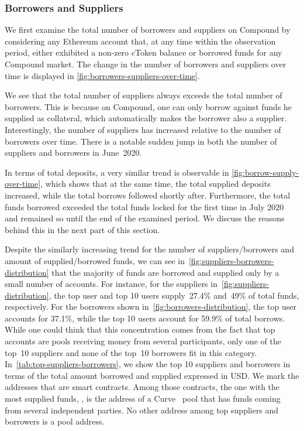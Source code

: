 \subsubsection{Borrowers and Suppliers}
We first examine the total number of borrowers and suppliers on Compound by considering any Ethereum account that, at any time within the observation period, either exhibited a non-zero cToken balance or borrowed funds for any Compound market.
The change in the number of borrowers and suppliers over time is displayed in \autoref{fig:borrowers-suppliers-over-time}.

We see that the total number of suppliers always exceeds the total number of borrowers. 
This is because on Compound, one can only borrow against funds he supplied as collateral, which automatically makes the borrower also a supplier. 
Interestingly, the number of suppliers has increased relative to the number of borrowers over time. 
There is a notable sudden jump in both the number of suppliers and borrowers in June~2020.

In terms of total deposits, a very similar trend is observable in \autoref{fig:borrow-supply-over-time}, which shows that at the same time, the total supplied deposits increased, while the total borrows followed shortly after.
Furthermore, the total funds borrowed exceeded the total funds locked for the first time in July 2020 and remained so until the end of the examined period.
We discuss the reasons behind this in the next part of this section.

Despite the similarly increasing trend for the number of suppliers/borrowers and amount of supplied/borrowed funds, we can see in~\autoref{fig:suppliers-borrowers-distribution} that the majority of funds are borrowed and supplied only by a small number of accounts.
For instance, for the suppliers in~\autoref{fig:suppliers-distribution}, the top user and top 10 users supply~27.4\% and~49\% of total funds, respectively.
For the borrowers shown in~\autoref{fig:borrowers-distribution}, the top user accounts for 37.1\%, while the top 10 users account for 59.9\% of total borrows.
While one could think that this concentration comes from the fact that top accounts are pools receiving money from several participants, only one of the top~10 suppliers and none of the top~10 borrowers fit in this category.
In~\autoref{tab:top-suppliers-borrowers}, we show the top 10 suppliers and borrowers in terms of the total amount borrowed and supplied expressed in USD.
We mark the addresses that are smart contracts. Among those contracts, the one with the most supplied funds, , is the address of a Curve~\cite{web:curve} pool that has funds coming from several independent parties.
No other address among top suppliers and borrowers is a pool address.



